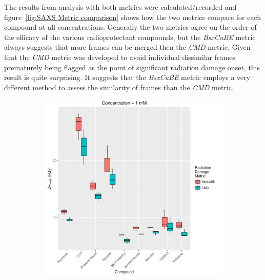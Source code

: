 The results from analysis with both metrics were calculated/recorded and figure~\ref{fig:SAXS Metric comparison} shows how the two metrics compare for each compound at all concentrations.
Generally the two metrics agree on the order of the efficacy of the various radioprotectant compounds, but the \textit{BsxCuBE} metric always suggests that more frames can be merged then the \textit{CMD} metric.
Given that the \textit{CMD} metric was developed to avoid individual dissimilar frames prematurely being flagged as the point of significant radiation damage onset, this result is quite surprising.
It suggests that the \textit{BsxCuBE} metric employs a very different method to assess the similarity of frames than the \textit{CMD} metric.
\begin{figure}
    \centering
    \begin{subfigure}[b]{0.75\textwidth}
            \centering
            \includegraphics[width=\textwidth]{figures/saxs/Conc_1_dose.pdf}
            \caption{}
            \label{fig:SAXS Metric comparison - 1mM}
    \end{subfigure}
    \\
    \begin{subfigure}[b]{0.75\textwidth}
            \centering

\end{subfigure}
\end{figure}

